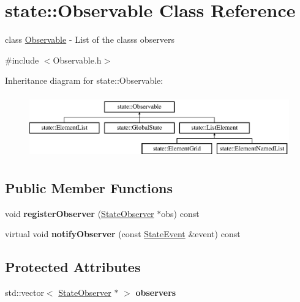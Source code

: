 \hypertarget{classstate_1_1_observable}{}\section{state\+:\+:Observable Class Reference}
\label{classstate_1_1_observable}


class \hyperlink{classstate_1_1_observable}{Observable} -\/ List of the class\textquotesingle{}s observers  




{\ttfamily \#include $<$Observable.\+h$>$}

Inheritance diagram for state\+:\+:Observable\+:\begin{figure}[H]
\begin{center}
\leavevmode
\includegraphics[height=2.727273cm]{classstate_1_1_observable}
\end{center}
\end{figure}
\subsection*{Public Member Functions}
\begin{DoxyCompactItemize}
\item 
\mbox{\label{classstate_1_1_observable_a3be8c3715d705eb217abbd5c80718ce7}} 
void {\bfseries register\+Observer} (\hyperlink{classstate_1_1_state_observer}{State\+Observer} $\ast$obs) const
\item 
\mbox{\label{classstate_1_1_observable_ab7c1dc9dc8f731d89f0285a993bc20d9}} 
virtual void {\bfseries notify\+Observer} (const \hyperlink{classstate_1_1_state_event}{State\+Event} \&event) const
\end{DoxyCompactItemize}
\subsection*{Protected Attributes}
\begin{DoxyCompactItemize}
\item 
\mbox{\label{classstate_1_1_observable_afbb99906de5c948b84026cdf0cf154b3}} 
std\+::vector$<$ \hyperlink{classstate_1_1_state_observer}{State\+Observer} $\ast$ $>$ {\bfseries observers}
\end{DoxyCompactItemize}



